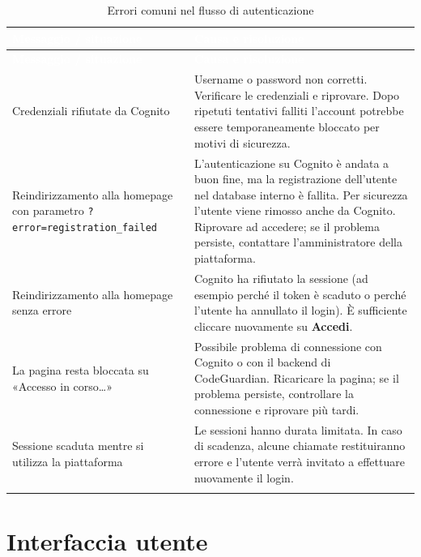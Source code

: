 \documentclass[a4paper, 11pt]{article}
\begin{document}
\begin{longtable}{>{\raggedright\arraybackslash}p{5cm} >{\raggedright\arraybackslash}p{9cm}}
  \rowcolor{AccentColor}
  \textcolor{white}{\textbf{Messaggio / situazione}} &
  \textcolor{white}{\textbf{Causa e risoluzione}} \\
  \endfirsthead

  \rowcolor{AccentColor}
  \textcolor{white}{\textbf{Messaggio / situazione}} &
  \textcolor{white}{\textbf{Causa e risoluzione}} \\
  \endhead

  Credenziali rifiutate da Cognito &
  Username o password non corretti. Verificare le credenziali e riprovare. Dopo ripetuti tentativi falliti l'account potrebbe essere temporaneamente bloccato per motivi di sicurezza. \\
  Reindirizzamento alla homepage con parametro \texttt{?error=registration\_failed} &
  L'autenticazione su Cognito è andata a buon fine, ma la registrazione dell'utente nel database interno è fallita. Per sicurezza l'utente viene rimosso anche da Cognito. Riprovare ad accedere; se il problema persiste, contattare l'amministratore della piattaforma. \\
  Reindirizzamento alla homepage senza errore &
  Cognito ha rifiutato la sessione (ad esempio perché il token è scaduto o perché l'utente ha annullato il login). È sufficiente cliccare nuovamente su \textbf{Accedi}. \\
  La pagina resta bloccata su «Accesso in corso\ldots» &
  Possibile problema di connessione con Cognito o con il backend di CodeGuardian. Ricaricare la pagina; se il problema persiste, controllare la connessione e riprovare più tardi. \\
  Sessione scaduta mentre si utilizza la piattaforma &
  Le sessioni hanno durata limitata. In caso di scadenza, alcune chiamate restituiranno errore e l'utente verrà invitato a effettuare nuovamente il login. \\
\caption{Errori comuni nel flusso di autenticazione}
\label{tab:errori-auth}
\end{longtable}

\newpage
\section{Interfaccia utente}
\end{document}
